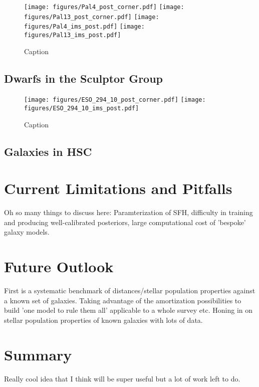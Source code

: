 \documentclass[twocolumn]{aastex631}
\begin{document}
\begin{figure*}
    \centering
    \texttt{[image: figures/Pal4\_post\_corner.pdf]}
    \texttt{[image: figures/Pal13\_post\_corner.pdf]}
    \texttt{[image: figures/Pal4\_ims\_post.pdf]}
    \hspace{1cm}
    \texttt{[image: figures/Pal13\_ims\_post.pdf]}
    \caption{Caption}
    \label{fig:GCs}
\end{figure*}


\subsection{Dwarfs in the Sculptor Group}
\label{sec:scul}

\begin{figure*}
    \centering
    \texttt{[image: figures/ESO\_294\_10\_post\_corner.pdf]}
    \texttt{[image: figures/ESO\_294\_10\_ims\_post.pdf]}
    \caption{Caption}
    \label{fig:GCs}
\end{figure*}

\subsection{Galaxies in HSC}
\label{sec:hsc}

\section{Current Limitations and Pitfalls}
\label{sec:issues}
Oh so many things to discuss here: Paramterization of SFH, difficulty in training and producing well-calibrated posteriors, large computational cost of 'bespoke' galaxy models.

\section{Future Outlook}
\label{sec:future}
First is a systematic benchmark of distances/stellar population properties against a known set of galaxies. Taking advantage of the amortization possibilities to build 'one model to rule them all' applicable to a whole survey etc. Honing in on stellar population properties of known galaxies with lots of data.

\section{Summary}
\label{sec:summary}
Really cool idea that I think will be super useful but a lot of work left to do.
\end{document}
